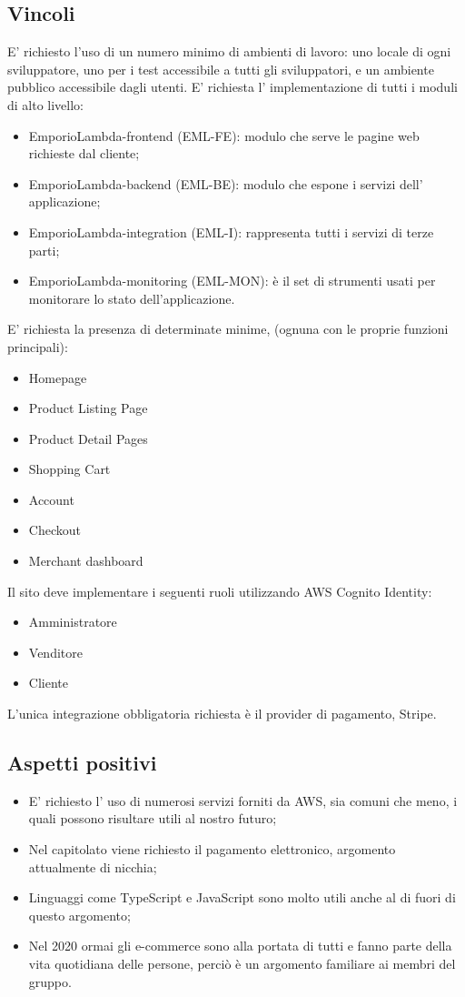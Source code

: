 \subsection{Vincoli}
E' richiesto l'uso di un numero minimo di ambienti di lavoro: uno locale di ogni sviluppatore, uno per i test accessibile a tutti gli sviluppatori, e un ambiente pubblico accessibile dagli utenti.
E' richiesta l' implementazione di tutti i moduli di alto livello:
\begin{itemize}
\item	EmporioLambda-frontend (EML-FE): modulo che serve le pagine web richieste dal cliente;
\item	EmporioLambda-backend (EML-BE): modulo che espone i servizi dell' applicazione;
\item	EmporioLambda-integration (EML-I): rappresenta tutti i servizi di terze parti;
\item	 EmporioLambda-monitoring (EML-MON): è il set di strumenti usati per monitorare lo stato dell'applicazione.
\end{itemize}
E' richiesta la presenza di determinate minime, (ognuna con le proprie funzioni principali):
\begin{itemize}
\item	Homepage
\item	Product Listing Page
\item	Product Detail Pages
\item	Shopping Cart
\item	Account
\item	Checkout
\item	Merchant dashboard
\end{itemize}
Il sito deve implementare i seguenti ruoli utilizzando AWS Cognito Identity:
\begin{itemize}
\item	Amministratore
\item	Venditore
\item	Cliente
\end{itemize}
L'unica integrazione obbligatoria richiesta è il provider di pagamento, Stripe.
\subsection{Aspetti positivi}
\begin{itemize}
\item	E' richiesto l' uso di numerosi servizi forniti da AWS, sia comuni che meno, i quali possono risultare utili al nostro futuro;
\item	Nel capitolato viene richiesto il pagamento elettronico, argomento attualmente di nicchia;
\item	Linguaggi come TypeScript e JavaScript sono molto utili anche al di fuori di questo argomento;
\item	Nel 2020 ormai gli e-commerce sono alla portata di tutti e fanno parte della vita quotidiana delle persone, perciò è un argomento familiare ai membri del gruppo.
\end{itemize}
